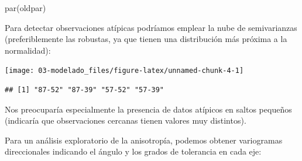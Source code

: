 \documentclass[
  spanish,
]{book}
\newenvironment{Shaded}{\begin{snugshade}}{\end{snugshade}}
\newcommand{\AttributeTok}[1]{\textcolor[rgb]{0.77,0.63,0.00}{#1}}
\newcommand{\DecValTok}[1]{\textcolor[rgb]{0.00,0.00,0.81}{#1}}
\newcommand{\FunctionTok}[1]{\textcolor[rgb]{0.00,0.00,0.00}{#1}}
\newcommand{\NormalTok}[1]{#1}
\newcommand{\OtherTok}[1]{\textcolor[rgb]{0.56,0.35,0.01}{#1}}
\newcommand{\SpecialCharTok}[1]{\textcolor[rgb]{0.00,0.00,0.00}{#1}}
\newcommand{\StringTok}[1]{\textcolor[rgb]{0.31,0.60,0.02}{#1}}
\theoremstyle{break}
\theoremstyle{definition}
\theoremstyle{definition}
\theoremstyle{definition}
\theoremstyle{definition}
\theoremstyle{remark}
\begin{document}
\begin{Shaded}
\begin{Highlighting}[]
\FunctionTok{par}\NormalTok{(oldpar)}
\end{Highlighting}
\end{Shaded}

Para detectar observaciones atípicas podríamos emplear la nube de semivarianzas (preferiblemente las robustas, ya que tienen una distribución más próxima a la normalidad):

\begin{Shaded}
\end{Shaded}

\begin{center}\texttt{[image: 03-modelado\_files/figure-latex/unnamed-chunk-4-1]} \end{center}

\begin{verbatim}
## [1] "87-52" "87-39" "57-52" "57-39"
\end{verbatim}

Nos preocuparía especialmente la presencia de datos atípicos en saltos pequeños (indicaría que observaciones cercanas tienen valores muy distintos).

Para un análisis exploratorio de la anisotropía, podemos obtener variogramas direccionales indicando el ángulo y los grados de tolerancia en cada eje:
\end{document}
